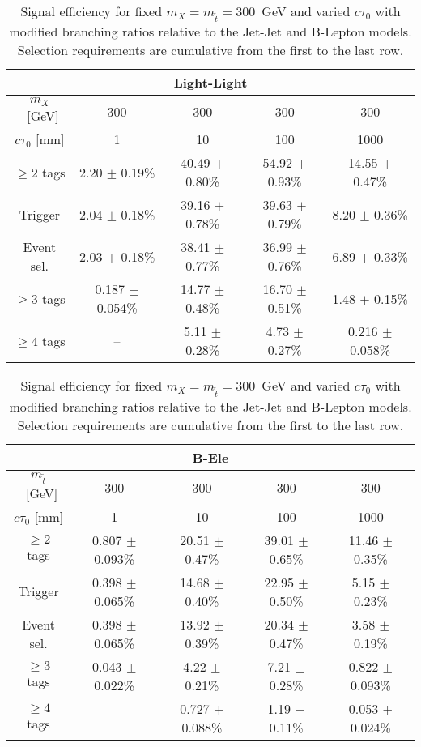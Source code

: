 \begin{table}[tb]
  \caption{ Signal efficiency for fixed $m_{X}=m_{\tilde{t}}=300$~GeV
    and varied $c\tau_0$ with modified branching ratios relative to 
    the Jet-Jet and B-Lepton models. Selection requirements are cumulative from
    the first to the last row.  
    \label{tab:cutflow_BR_lifetime}}
\begin{center}
\begin{tabular}{ccccc} 
\multicolumn{5}{c}{\textbf{Light-Light}} \\
 \hline 
 $m_{X}$~[GeV] & 300 & 300 & 300 & 300 \\ 
 $c\tau_0$ [mm] & 1 & 10 & 100 & 1000 \\ 
 \hline 
 $\geq 2$ tags &        2.20 $\pm$ 0.19\% &     40.49 $\pm$ 0.80\% &    54.92 $\pm$ 0.93\% &    14.55 $\pm$ 0.47\% \\ 
 Trigger &     2.04 $\pm$ 0.18\% &        39.16 $\pm$ 0.78\% &     39.63 $\pm$ 0.79\% &    8.20 $\pm$ 0.36\% \\ 
 Event sel. &  2.03 $\pm$ 0.18\% &   38.41 $\pm$ 0.77\% &     36.99 $\pm$ 0.76\% &    6.89 $\pm$ 0.33\% \\ 
 $\geq 3$ tags &    0.187 $\pm$ 0.054\% &       14.77 $\pm$ 0.48\% &     16.70 $\pm$ 0.51\% &   1.48 $\pm$ 0.15\% \\ 
 $\geq 4$ tags &    -- &     5.11 $\pm$ 0.28\% &   4.73 $\pm$ 0.27\% &      0.216 $\pm$ 0.058\% \\ 
\end{tabular}

\begin{tabular}{ccccc} 
\multicolumn{5}{c}{\textbf{B-Ele}} \\
 \hline 
 $m_{\tilde{t}}$~[GeV] & 300 & 300 & 300 & 300 \\ 
 $c\tau_0$ [mm] & 1 & 10 & 100 & 1000 \\ 
 \hline 
  $\geq 2$ tags &        0.807 $\pm$ 0.093\% &   20.51 $\pm$ 0.47\% &    39.01 $\pm$ 0.65\% &    11.46 $\pm$ 0.35\% \\ 
   Trigger &     0.398 $\pm$ 0.065\% &        14.68 $\pm$ 0.40\% &   22.95 $\pm$ 0.50\% &    5.15 $\pm$ 0.23\% \\ 
    Event sel. &   0.398 $\pm$ 0.065\% &  13.92 $\pm$ 0.39\% &   20.34 $\pm$ 0.47\% &    3.58 $\pm$ 0.19\% \\ 
     $\geq 3$ tags &     0.043 $\pm$ 0.022\% &  4.22 $\pm$ 0.21\% &    7.21 $\pm$ 0.28\% &     0.822 $\pm$ 0.093\% \\ 
      $\geq 4$ tags &     -- &  0.727 $\pm$ 0.088\% &       1.19 $\pm$ 0.11\% &    0.053 $\pm$ 0.024\% \\ 
\end{tabular}


\end{center}
\end{table}
